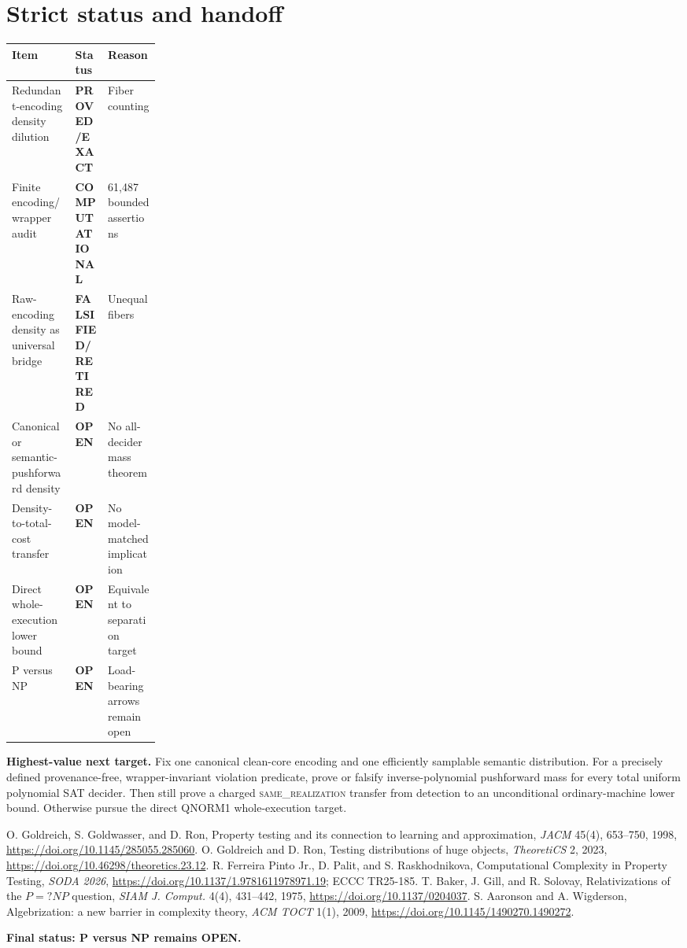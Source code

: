 \documentclass[11pt]{article}
\newcommand{\EXACT}{\textbf{PROVED/EXACT}}
\newcommand{\COMP}{\textbf{COMPUTATIONAL}}
\newcommand{\OPEN}{\textbf{OPEN}}
\newcommand{\RET}{\textbf{FALSIFIED/RETIRED}}
\newcommand{\same}{\textsc{same\_realization}}
\begin{document}
\section{Strict status and handoff}
\begin{center}
\begin{tabularx}{0.98\linewidth}{Xp{0.22\linewidth}X}
\toprule Item & Status & Reason\\ \midrule
Redundant-encoding density dilution & \EXACT & Fiber counting\\
Finite encoding/wrapper audit & \COMP & 61,487 bounded assertions\\
Raw-encoding density as universal bridge & \RET & Unequal fibers\\
Canonical or semantic-pushforward density & \OPEN & No all-decider mass theorem\\
Density-to-total-cost transfer & \OPEN & No model-matched implication\\
Direct whole-execution lower bound & \OPEN & Equivalent to separation target\\
P versus NP & \OPEN & Load-bearing arrows remain open\\
\bottomrule
\end{tabularx}
\end{center}

\textbf{Highest-value next target.} Fix one canonical clean-core encoding and
one efficiently samplable semantic distribution. For a precisely defined
provenance-free, wrapper-invariant violation predicate, prove or falsify
inverse-polynomial pushforward mass for every total uniform polynomial SAT
decider. Then still prove a charged \same{} transfer from detection to an
unconditional ordinary-machine lower bound. Otherwise pursue the direct
QNORM1 whole-execution target.

\begin{thebibliography}{99}
 O. Goldreich, S. Goldwasser, and D. Ron, Property testing and
its connection to learning and approximation, \emph{JACM} 45(4), 653--750,
1998, \url{https://doi.org/10.1145/285055.285060}.
 O. Goldreich and D. Ron, Testing distributions of huge objects,
\emph{TheoretiCS} 2, 2023,
\url{https://doi.org/10.46298/theoretics.23.12}.
 R. Ferreira Pinto Jr., D. Palit, and S. Raskhodnikova,
Computational Complexity in Property Testing, \emph{SODA 2026},
\url{https://doi.org/10.1137/1.9781611978971.19}; ECCC TR25-185.
 T. Baker, J. Gill, and R. Solovay, Relativizations of the
\(P=?NP\) question, \emph{SIAM J. Comput.} 4(4), 431--442, 1975,
\url{https://doi.org/10.1137/0204037}.
 S. Aaronson and A. Wigderson, Algebrization: a new barrier in
complexity theory, \emph{ACM TOCT} 1(1), 2009,
\url{https://doi.org/10.1145/1490270.1490272}.
\end{thebibliography}

\bigskip
\noindent\textbf{Final status: P versus NP remains OPEN.}

\end{document}
